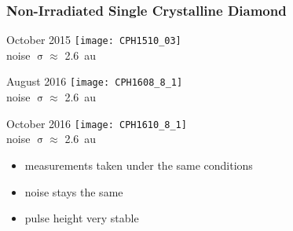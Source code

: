 \begin{frame}
	\frametitle{Non-Irradiated Single Crystalline Diamond}
	\def \sp {3.7cm}
	\begin{minipage}{\sp}
		\centering
		October 2015 
		\texttt{[image: CPH1510\_03]}\\
		noise $\upsigma\approx$ \SI{2.6}{au}
	\end{minipage}
	\hspace*{2pt}
	\begin{minipage}{\sp}
		\centering
		August 2016
		\texttt{[image: CPH1608\_8\_1]}\\
		noise $\upsigma\approx$ \SI{2.6}{au}
	\end{minipage}
	\hspace*{2pt}
	\begin{minipage}{\sp}
		\centering
		October 2016
		\texttt{[image: CPH1610\_8\_1]}\\
		noise $\upsigma \approx$ \SI{2.6}{au}
	\end{minipage}\s
	\begin{itemize}
		\item measurements taken under the same conditions
		\item noise stays the same
		\item pulse height very stable
	\end{itemize}
\end{frame}

